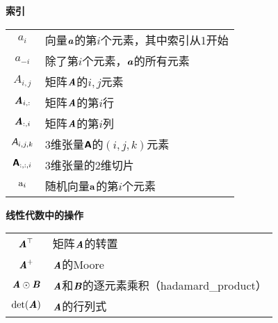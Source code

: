 \vspace{\notationgap}
\begin{minipage}{\textwidth}
\centerline{\bf 索引}
\bgroup
\def\arraystretch{1.5}
\begin{tabular}{cp{3.25in}}
$\displaystyle a_i$ & 向量$\boldsymbol{\mathit{a}}$的第$i$个元素，其中索引从1开始  \\
$\displaystyle a_{-i}$ & 除了第$i$个元素，$\boldsymbol{\mathit{a}}$的所有元素 \\
$\displaystyle A_{i,j}$ & 矩阵$\boldsymbol{\mathit{A}}$的$i,j$元素 \\
$\displaystyle \boldsymbol{\mathit{A}}_{i, :}$ & 矩阵$\boldsymbol{\mathit{A}}$的第$i$行 \\
$\displaystyle \boldsymbol{\mathit{A}}_{:, i}$ & 矩阵$\boldsymbol{\mathit{A}}$的第$i$列 \\
$\displaystyle \textit{\textsf{A}}_{i, j, k}$ & 3维张量$\textsf{\textbf{A}}$的$(i, j, k)$元素   \\
$\displaystyle \textsf{\textbf{A}}_{:, :, i}$ & 3维张量的2维切片 \\
$\displaystyle \mathrm{a}_i$ & 随机向量$\mathbf{a}$的第$i$个元素 \\
\end{tabular} 
\egroup
\end{minipage}

\vspace{\notationgap}
\begin{minipage}{\textwidth}
\centerline{\bf 线性代数中的操作}
\bgroup
\def\arraystretch{1.5}
\begin{tabular}{cp{3.25in}}
$\displaystyle \boldsymbol{\mathit{A}}^\top$ & 矩阵$\boldsymbol{\mathit{A}}$的转置 \\
$\displaystyle \boldsymbol{\mathit{A}}^+$ & $\boldsymbol{\mathit{A}}$的\gls{Moore} \\
    $\displaystyle \boldsymbol{\mathit{A}} \odot \boldsymbol{\mathit{B}} $ &  $\boldsymbol{\mathit{A}}$和$\boldsymbol{\mathit{B}}$的逐元素乘积（\gls{hadamard_product}） \\
$\displaystyle \mathrm{det}(\boldsymbol{\mathit{A}})$ & $\boldsymbol{\mathit{A}}$的行列式 \\
\end{tabular} 
\egroup
\end{minipage}

